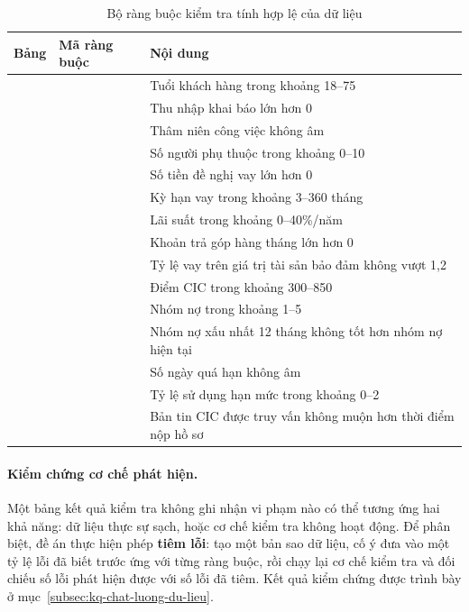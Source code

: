\begin{table}[htbp]
\centering
\caption{Bộ ràng buộc kiểm tra tính hợp lệ của dữ liệu}
\label{tab:validity-rules}
\small
\setlength{\tabcolsep}{5pt}
\renewcommand{\arraystretch}{1.15}
\begin{tabular}{@{}L{2.5cm}L{4.8cm}L{6.6cm}@{}}
\toprule
\textbf{Bảng} & \textbf{Mã ràng buộc} & \textbf{Nội dung} \\
\midrule
{}
  &         & Tuổi khách hàng trong khoảng 18--75 \\
  &   & Thu nhập khai báo lớn hơn 0 \\
  &     & Thâm niên công việc không âm \\
  &  & Số người phụ thuộc trong khoảng 0--10 \\
\midrule
{}
  &      & Số tiền đề nghị vay lớn hơn 0 \\
  &          & Kỳ hạn vay trong khoảng 3--360 tháng \\
  &           & Lãi suất trong khoảng 0--40\%/năm \\
  &  & Khoản trả góp hàng tháng lớn hơn 0 \\
  &            & Tỷ lệ vay trên giá trị tài sản bảo đảm
  không vượt 1,2 \\
\midrule
{}
  &        & Điểm CIC trong khoảng 300--850 \\
  &        & Nhóm nợ trong khoảng 1--5 \\
  &        & Nhóm nợ xấu nhất 12 tháng không tốt hơn
  nhóm nợ hiện tại \\
  &         & Số ngày quá hạn không âm \\
  &  & Tỷ lệ sử dụng hạn mức trong khoảng 0--2 \\
  &  & Bản tin CIC được truy vấn không muộn hơn
  thời điểm nộp hồ sơ \\
\bottomrule
\end{tabular}
\end{table}

\paragraph{Kiểm chứng cơ chế phát hiện.} Một bảng kết quả kiểm tra không ghi nhận
vi phạm nào có thể tương ứng hai khả năng: dữ liệu thực sự sạch, hoặc cơ chế kiểm
tra không hoạt động. Để phân biệt, đề án thực hiện phép \textbf{tiêm lỗi}: tạo
một bản sao dữ liệu, cố ý đưa vào một tỷ lệ lỗi đã biết trước ứng với từng ràng
buộc, rồi chạy lại cơ chế kiểm tra và đối chiếu số lỗi phát hiện được với số lỗi
đã tiêm. Kết quả kiểm chứng được trình bày ở
mục~\ref{subsec:kq-chat-luong-du-lieu}.

